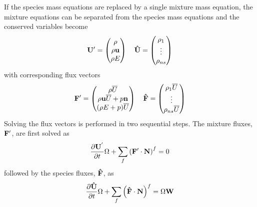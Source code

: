 If the species mass equations are replaced by a single mixture mass equation,
the mixture equations can be separated from the species mass
equations and the conserved variables become
\begin{equation}
	\mathbf U' =
  \begin{pmatrix}
		\rho \\
		\rho \mathbf u \\
		\rho E
	\end{pmatrix} \quad
	\mathbf{\hat{U}} =
  \begin{pmatrix}
		\rho_1 \\
		\vdots \\
		\rho_{ns}
  \end{pmatrix}
  \label{dc-variables}
\end{equation}
with corresponding flux vectors
\begin{equation}
 	\mathbf F' = 
  \begin{pmatrix}
		\rho \overline{U} \\
		\rho \mathbf u \overline{U} + p \mathbf{n} \\
		(\rho E + p) \overline{U} \\
	\end{pmatrix} \quad
 	\mathbf{\hat{F}} = 
  \begin{pmatrix}
		\rho_1  \overline{U} \\
		\vdots \\
		\rho_{ns} \overline{U} \\
	\end{pmatrix}
  \label{dc-fluxes}
\end{equation}
Solving the flux vectors is performed in two sequential steps.  The mixture
fluxes, $\mathbf F'$, are first solved as
\begin{equation}
  \frac{\partial \mathbf{U}^{'}}{\partial t} \Omega + \sum\limits_{f}^{}{\left(\mathbf F' \cdot \mathbf{N}\right)^f} = 0
  \label{dc-flux-part-1}
\end{equation}
followed by the species fluxes, $\mathbf{\hat{F}}$, as
\begin{equation}
  \frac{\partial \mathbf{\hat{U}}}{\partial t} \Omega + \sum\limits_{f}^{}{\left(\mathbf{\hat{F}} \cdot \mathbf{N}\right)^f} = \Omega \mathbf W
  \label{dc-flux-part-2}
\end{equation}
